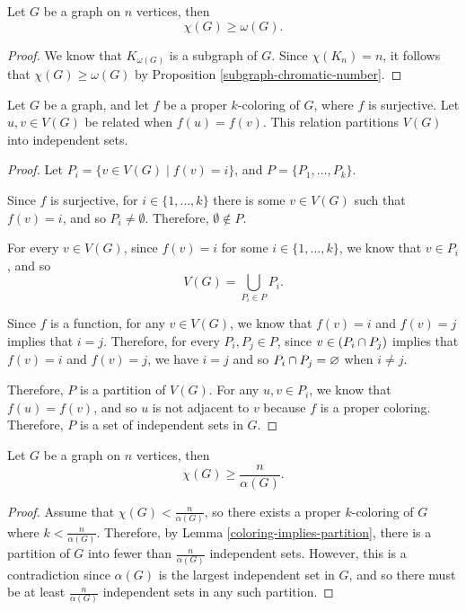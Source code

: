 \begin{prop}\label{chromatic-cliques-independent-sets}
    Let $G$ be a graph on $n$ vertices, then
    \[\chi(G) \geq \omega(G).\]
\end{prop}

\begin{proof}
    We know that $K_{\omega(G)}$ is a subgraph of $G$. Since $\chi(K_n) = n$, it follows that $\chi(G) \geq \omega(G)$ by Proposition \ref{subgraph-chromatic-number}.
\end{proof}

\begin{lemma}\label{coloring-implies-partition}
    Let $G$ be a graph, and let $f$ be a proper $k$-coloring of $G$, where $f$ is surjective. Let $u, v \in V(G)$ be related when $f(u) = f(v)$. This relation partitions $V(G)$ into independent sets.
\end{lemma}

\begin{proof}\proofbreak
    Let $P_i = \{v \in V(G) \mid f(v) = i\}$, and $P = \{P_1, \ldots, P_k\}$.

    Since $f$ is surjective, for $i \in \{1, \ldots, k\}$ there is some $v \in V(G)$ such that $f(v) = i$, and so $P_i \neq \emptyset$. Therefore, $\emptyset \notin P$.

    For every $v \in V(G)$, since $f(v) = i$ for some $i \in \{1, \ldots, k\}$, we know that $v \in P_i$, and so
    \[V(G) = \bigcup_{P_i\in P}P_i.\]

    Since $f$ is a function, for any $v \in V(G)$, we know that $f(v) = i$ and $f(v) = j$ implies that $i = j$. Therefore, for every $P_i, P_j \in P$, since $v \in (P_i \cap P_j)$ implies that $f(v) = i$ and $f(v) = j$, we have $i = j$ and so $P_i \cap P_j = \varnothing$ when $i \neq j$.

    Therefore, $P$ is a partition of $V(G)$. For any $u, v \in P_i$, we know that $f(u) = f(v)$, and so $u$ is not adjacent to $v$ because $f$ is a proper coloring. Therefore, $P$ is a set of independent sets in $G$.
\end{proof}

\begin{prop}
    Let $G$ be a graph on $n$ vertices, then
    \[\chi(G) \geq \frac{n}{\alpha(G)}.\]
\end{prop}

\begin{proof}
    Assume that $\chi(G) < \frac{n}{\alpha(G)}$, so there exists a proper $k$-coloring of $G$ where $k < \frac{n}{\alpha(G)}$. Therefore, by Lemma \ref{coloring-implies-partition}, there is a partition of $G$ into fewer than $\frac{n}{\alpha(G)}$ independent sets. However, this is a contradiction since $\alpha(G)$ is the largest independent set in $G$, and so there must be at least $\frac{n}{\alpha(G)}$ independent sets in any such partition.
\end{proof}

